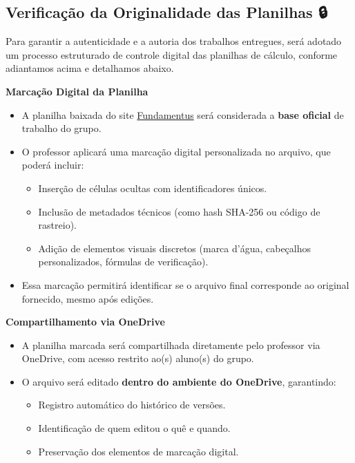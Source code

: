 \documentclass[
  a4paper,
]{book}
\providecommand{\tightlist}{%
  \setlength{\itemsep}{0pt}\setlength{\parskip}{0pt}}\usepackage{longtable,booktabs,array}
\begin{document}
\subsection{Verificação da Originalidade das Planilhas
🔒}\label{verificauxe7uxe3o-da-originalidade-das-planilhas}

Para garantir a autenticidade e a autoria dos trabalhos entregues, será
adotado um processo estruturado de controle digital das planilhas de
cálculo, conforme adiantamos acima e detalhamos abaixo.

\textbf{Marcação Digital da Planilha}

\begin{itemize}
\item
  A planilha baixada do site
  \href{https://www.fundamentus.com.br}{Fundamentus} será considerada a
  \textbf{base oficial} de trabalho do grupo.
\item
  O professor aplicará uma marcação digital personalizada no arquivo,
  que poderá incluir:

  \begin{itemize}
  \tightlist
  \item
    Inserção de células ocultas com identificadores únicos.
  \item
    Inclusão de metadados técnicos (como hash SHA-256 ou código de
    rastreio).
  \item
    Adição de elementos visuais discretos (marca d'água, cabeçalhos
    personalizados, fórmulas de verificação).
  \end{itemize}
\item
  Essa marcação permitirá identificar se o arquivo final corresponde ao
  original fornecido, mesmo após edições.
\end{itemize}

\textbf{Compartilhamento via OneDrive}

\begin{itemize}
\item
  A planilha marcada será compartilhada diretamente pelo professor via
  OneDrive, com acesso restrito ao(s) aluno(s) do grupo.
\item
  O arquivo será editado \textbf{dentro do ambiente do OneDrive},
  garantindo:

  \begin{itemize}
  \tightlist
  \item
    Registro automático do histórico de versões.
  \item
    Identificação de quem editou o quê e quando.
  \item
    Preservação dos elementos de marcação digital.
  \end{itemize}
\end{itemize}
\end{document}
